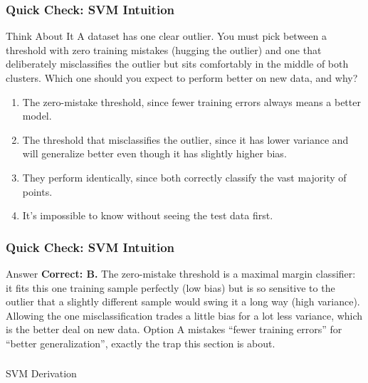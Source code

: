 \begin{frame}[fragile]\frametitle{Quick Check: SVM Intuition}
\begin{block}{Think About It}
A dataset has one clear outlier. You must pick between a threshold with zero training
mistakes (hugging the outlier) and one that deliberately misclassifies the outlier but sits
comfortably in the middle of both clusters. Which one should you expect to perform better on
new data, and why?
\begin{enumerate}
\item[A.] The zero-mistake threshold, since fewer training errors always means a better model.
\item[B.] The threshold that misclassifies the outlier, since it has lower variance and will
generalize better even though it has slightly higher bias.
\item[C.] They perform identically, since both correctly classify the vast majority of points.
\item[D.] It's impossible to know without seeing the test data first.
\end{enumerate}
\end{block}
\end{frame}

\begin{frame}[fragile]\frametitle{Quick Check: SVM Intuition}
\begin{block}{Answer}
\textbf{Correct: B.} The zero-mistake threshold is a maximal margin classifier: it fits this
one training sample perfectly (low bias) but is so sensitive to the outlier that a slightly
different sample would swing it a long way (high variance). Allowing the one misclassification
trades a little bias for a lot less variance, which is the better deal on new data. Option A
mistakes ``fewer training errors'' for ``better generalization'', exactly the trap this section
is about.
\end{block}
\end{frame}

\begin{frame}[fragile]\frametitle{}
\begin{center}
{\Large SVM Derivation}
\end{center}
\end{frame}

